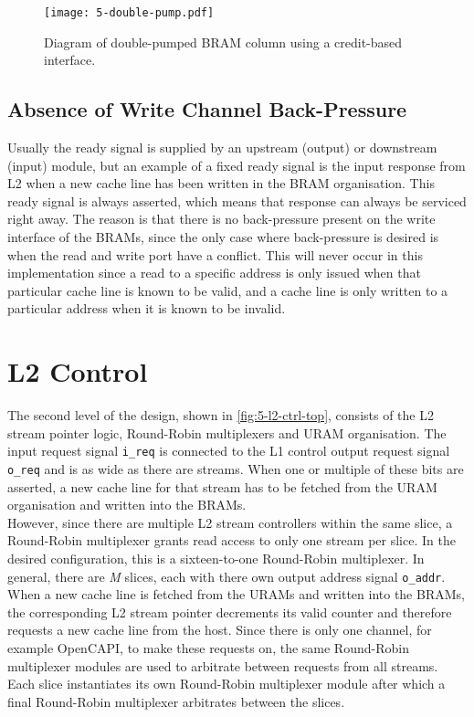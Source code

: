 \begin{figure}[H]
  \centering
  \texttt{[image: 5-double-pump.pdf]}
  \caption{Diagram of double-pumped BRAM column using a credit-based interface.}
  \label{fig:5-double-pump}
\end{figure}

\subsection{Absence of Write Channel Back-Pressure}
Usually the ready signal is supplied by an upstream (output) or downstream (input) module, but an example of a fixed ready signal is the input response from L2 when a new cache line has been written in the BRAM organisation. This ready signal is always asserted, which means that response can always be serviced right away. The reason is that there is no back-pressure present on the write interface of the BRAMs, since the only case where back-pressure is desired is when the read and write port have a conflict. This will never occur in this implementation since a read to a specific address is only issued when that particular cache line is known to be valid, and a cache line is only written to a particular address when it is known to be invalid.





\section{L2 Control}
The second level of the design, shown in \autoref{fig:5-l2-ctrl-top}, consists of the L2 stream pointer logic, Round-Robin multiplexers and URAM organisation. The input request signal \texttt{i\_req} is connected to the L1 control output request signal \texttt{o\_req} and is as wide as there are streams. When one or multiple of these bits are asserted, a new cache line for that stream has to be fetched from the URAM organisation and written into the BRAMs.\\
However, since there are multiple L2 stream controllers within the same slice, a Round-Robin multiplexer grants read access to only one stream per slice. In the desired configuration, this is a sixteen-to-one Round-Robin multiplexer. In general, there are \textit{M} slices, each with there own output address signal \texttt{o\_addr}.\\
When a new cache line is fetched from the URAMs and written into the BRAMs, the corresponding L2 stream pointer decrements its valid counter and therefore requests a new cache line from the host. Since there is only one channel, for example OpenCAPI, to make these requests on, the same Round-Robin multiplexer modules are used to arbitrate between requests from all streams. Each slice instantiates its own Round-Robin multiplexer module after which a final Round-Robin multiplexer arbitrates between the slices.

